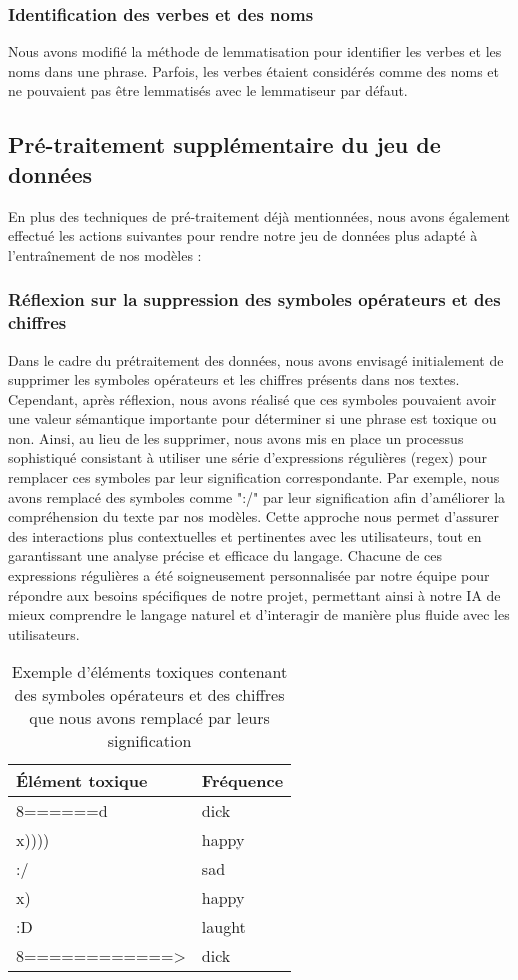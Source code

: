 \subsubsection*{Identification des verbes et des noms}

Nous avons modifié la méthode de lemmatisation pour identifier les verbes et les noms dans une phrase. Parfois, les verbes étaient considérés comme des noms et ne pouvaient pas être lemmatisés avec le lemmatiseur par défaut.

\subsection{Pré-traitement supplémentaire du jeu de données}

En plus des techniques de pré-traitement déjà mentionnées, nous avons également effectué les actions suivantes pour rendre notre jeu de données plus adapté à l'entraînement de nos modèles :

\subsubsection*{Réflexion sur la suppression des symboles opérateurs et des chiffres}

Dans le cadre du prétraitement des données, nous avons envisagé initialement de supprimer les symboles opérateurs et les chiffres présents dans nos textes. Cependant, après réflexion, nous avons réalisé que ces symboles pouvaient avoir une valeur sémantique importante pour déterminer si une phrase est toxique ou non. Ainsi, au lieu de les supprimer, nous avons mis en place un processus sophistiqué consistant à utiliser une série d'expressions régulières (regex) pour remplacer ces symboles par leur signification correspondante. Par exemple, nous avons remplacé des symboles comme ":/" par leur signification afin d'améliorer la compréhension du texte par nos modèles. Cette approche nous permet d'assurer des interactions plus contextuelles et pertinentes avec les utilisateurs, tout en garantissant une analyse précise et efficace du langage. Chacune de ces expressions régulières a été soigneusement personnalisée par notre équipe pour répondre aux besoins spécifiques de notre projet, permettant ainsi à notre IA de mieux comprendre le langage naturel et d'interagir de manière plus fluide avec les utilisateurs.

\begin{table}[h]
\centering
\begin{tabular}{|l|l|}
\hline
\textbf{Élément toxique} & \textbf{Fréquence} \\ \hline
8======d~~ & dick \\ \hline
x)))) & happy \\ \hline
:/ & sad \\ \hline
x) & happy \\ \hline
:D & laught \\ \hline
8============> & dick \\ \hline
\end{tabular}
\caption{Exemple d'éléments toxiques contenant des symboles opérateurs et des chiffres que nous avons remplacé par leurs signification}
\end{table}



